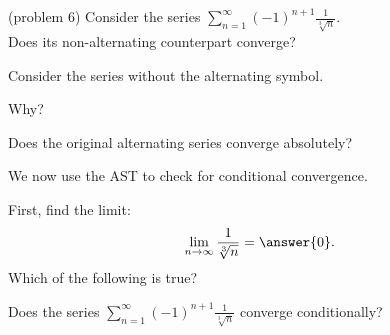 \documentclass[handout]{ximera}
\begin{document}
\begin{problem}(problem 6)
Consider the series $\displaystyle{\sum_{n=1}^\infty (-1)^{n+1} \frac{1}{\sqrt[3] n}}$.\\
Does its non-alternating counterpart converge?
\begin{hint} 
Consider the series without the alternating symbol.
\end{hint}
\begin{multipleChoice}
\end{multipleChoice}

Why?
\begin{multipleChoice}
\end{multipleChoice}




Does the original alternating series converge absolutely?
\begin{multipleChoice}
\end{multipleChoice}

We now use the AST to check for conditional convergence.

First, find the limit:
\[
\lim_{n\to\infty} \frac{1}{\sqrt[3] n} = \answer{0}.
\]
Which of the following is true?
\begin{multipleChoice}
\end{multipleChoice}


Does the series $\displaystyle{\sum_{n=1}^\infty (-1)^{n+1} \frac{1}{\sqrt[3] n}}$ converge conditionally?
\begin{multipleChoice}
\end{multipleChoice}

\end{problem}
\end{document}
